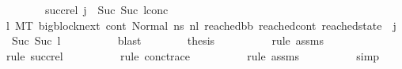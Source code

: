 \begin{isabellebody}
\ \ \ \ \ \ \ \ succ{\isacharunderscore}{\kern0pt}rel{\isacharcolon}{\kern0pt}\ {\isachardoublequoteopen}{\isacharparenleft}{\kern0pt}j{\isacharprime}{\kern0pt}\ {\isacharequal}{\kern0pt}\ Suc\ {\isacharparenleft}{\kern0pt}Suc\ l{}{\isacharunderscore}{\kern0pt}conc{\isacharparenright}{\kern0pt}{\isacharparenright}{\kern0pt}{\isachardoublequoteclose}\isanewline
\ \ \ \ \ \ \ \ \isamarkupfalse%
\ {\isacartoucheopen}{\isasymexists}l{}{\isachardot}{\kern0pt}\ {\isacharparenleft}{\kern0pt}M{\isacharcomma}{\kern0pt}{\isasymLambda}{\isacharcomma}{\kern0pt}{\isasymGamma}{\isacharcomma}{\kern0pt}{\isasymOmega}{\isacharcomma}{\kern0pt}T\ {\isasymturnstile}{\isacharparenleft}{\kern0pt}bigblock{\isacharunderscore}{\kern0pt}next{\isacharcomma}{\kern0pt}\ cont{}{\isacharcomma}{\kern0pt}\ Normal\ ns{}{\isacharprime}{\kern0pt}{\isacharprime}{\kern0pt}{\isacharparenright}{\kern0pt}\ {\isacharminus}{\kern0pt}n{\isasymlongrightarrow}{\isacharcircum}{\kern0pt}l{}\ {\isacharparenleft}{\kern0pt}reached{\isacharunderscore}{\kern0pt}bb{\isacharcomma}{\kern0pt}\ reached{\isacharunderscore}{\kern0pt}cont{\isacharcomma}{\kern0pt}\ reached{\isacharunderscore}{\kern0pt}state{\isacharparenright}{\kern0pt}{\isacharparenright}{\kern0pt}\ {\isasymand}\ j{\isacharprime}{\kern0pt}\ {\isacharequal}{\kern0pt}\ Suc\ {\isacharparenleft}{\kern0pt}Suc\ l{}{\isacharparenright}{\kern0pt}{\isacartoucheclose}\isanewline
\ \ \ \ \ \ \ \ \isamarkupfalse%
\ blast\isanewline
\ \ \ \ \ \ \isamarkupfalse%
\ {\isacharquery}{\kern0pt}thesis\isanewline
\ \ \ \ \ \ \ \ \isamarkupfalse%
\ {\isacharparenleft}{\kern0pt}rule\ assms{\isacharparenleft}{\kern0pt}{}{\isacharparenright}{\kern0pt}{\isacharparenright}{\kern0pt}\isanewline
\ \ \ \ \ \ \ \ \isamarkupfalse%
\ {\isacharparenleft}{\kern0pt}rule\ succ{\isacharunderscore}{\kern0pt}rel{\isacharparenright}{\kern0pt}\isanewline
\ \ \ \ \ \ \ \ \isamarkupfalse%
\ {\isacharparenleft}{\kern0pt}rule\ conc{\isacharunderscore}{\kern0pt}trace{\isacharparenright}{\kern0pt}\isanewline
\ \ \ \ \ \ \ \ \isamarkupfalse%
\ {\isacharparenleft}{\kern0pt}rule\ assms{\isacharparenleft}{\kern0pt}{}{\isacharparenright}{\kern0pt}{\isacharparenright}{\kern0pt}\isanewline
\ \ \ \ \ \ \ \ \isamarkupfalse%
\ {\isacharparenleft}{\kern0pt}simp{\isacharparenright}{\kern0pt}\isanewline
\ \ \ \ \ \ \ \ \isamarkupfalse%

\end{isabellebody}
